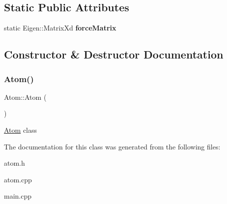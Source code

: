 \subsection*{Static Public Attributes}
\begin{DoxyCompactItemize}
\item 
\mbox{\label{class_atom_a8fadf04e83f1558c13192f91eee5348a}} 
static Eigen\+::\+Matrix\+Xd {\bfseries force\+Matrix}
\end{DoxyCompactItemize}


\subsection{Constructor \& Destructor Documentation}
\mbox{\label{class_atom_aa0147d7e49ab90f559b66e38d3d12863}} 
\subsubsection{\texorpdfstring{Atom()}{Atom()}}
{\footnotesize\ttfamily Atom\+::\+Atom (\begin{DoxyParamCaption}{ }\end{DoxyParamCaption})}

\mbox{\hyperlink{class_atom}{Atom}} class 

The documentation for this class was generated from the following files\+:\begin{DoxyCompactItemize}
\item 
atom.\+h\item 
atom.\+cpp\item 
main.\+cpp\end{DoxyCompactItemize}
